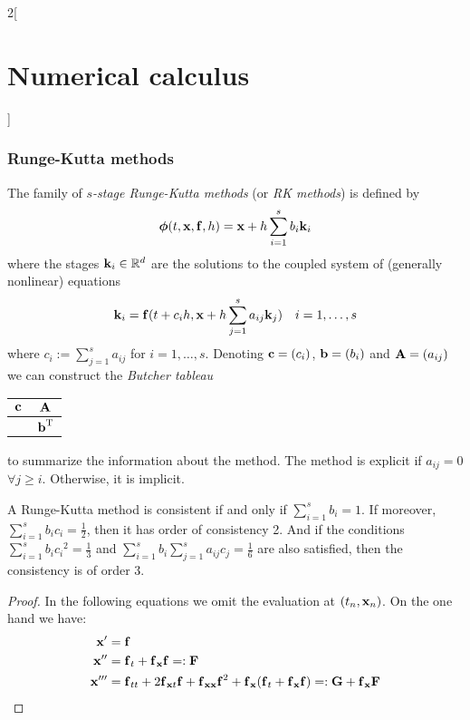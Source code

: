 \documentclass[../../../main_math.tex]{subfiles}
\begin{document}
\begin{multicols}{2}[\section{Numerical calculus}]
  \subsubsection{Runge-Kutta methods}
  \begin{definition}
    The family of \emph{$s$-stage Runge-Kutta methods} (or \emph{RK methods}) is defined by $$\boldsymbol{\mathrm{\phi}}(t,\boldsymbol{\mathrm{x}},\boldsymbol{\mathrm{f}},h)=\boldsymbol{\mathrm{x}}+h\sum_{i=1}^sb_i\boldsymbol{\mathrm{k}}_i$$
    where the stages $\boldsymbol{\mathrm{k}}_i\in\mathbb{R}^d$ are the solutions to the coupled system of (generally nonlinear) equations
    $$\boldsymbol{\mathrm{k}}_i=\boldsymbol{\mathrm{f}}(t+c_ih,\boldsymbol{\mathrm{x}}+h\sum_{j=1}^{s}a_{ij}\boldsymbol{\mathrm{k}}_j)\quad i=1,\ldots,s$$
    where $c_i:=\sum_{j=1}^{s}a_{ij}$ for $i=1,\ldots,s$. Denoting $\boldsymbol{\mathrm{c}}=(c_i)$, $\boldsymbol{\mathrm{b}}=(b_i)$ and $\boldsymbol{\mathrm{A}}=(a_{ij})$ we can construct the \emph{Butcher tableau}
    \begin{center}
      \renewcommand{\arraystretch}{1.25}
      \begin{tabular}{c|c}
        $\boldsymbol{\mathrm{c}}$ & $\boldsymbol{\mathrm{A}}$             \\
        \hline
                 & ${\boldsymbol{\mathrm{b}}}^{\mathrm{T}}$
      \end{tabular}
    \end{center}
    to summarize the information about the method. The method is explicit if $a_{ij}=0$ $\forall j\geq i$. Otherwise, it is implicit.
  \end{definition}
  \begin{lemma}\label{NC:consistencyRK}
    A Runge-Kutta method is consistent if and only if $\sum_{i=1}^sb_i=1$. If moreover, $\sum_{i=1}^sb_ic_i=\frac{1}{2}$, then it has order of consistency 2. And if the conditions $\sum_{i=1}^sb_i{c_i}^2=\frac{1}{3}$ and $\sum_{i=1}^sb_i\sum_{j=1}^sa_{ij}c_j=\frac{1}{6}$ are also satisfied, then the consistency is of order 3.
  \end{lemma}
  \begin{proof}
    In the following equations we omit the evaluation at $(t_n,\boldsymbol{\mathrm{x}}_n)$.
    On the one hand we have:
    \begin{align*}
      \vf{x}'   & =\vf{f}                                                                                                                                         \\
      \vf{x}''  & =\vf{f}_t+\vf{f}_{\vf{x}}\vf{f}=:\vf{F}                                                                                                         \\
      \vf{x}''' & =\vf{f}_{tt}+2\vf{f}_{\vf{x}t}\vf{f}+{\vf{f}_{\vf{xx}}}\vf{f}^2+\vf{f}_{\vf{x}}(\vf{f}_t+{\vf{f}_{\vf{x}}}\vf{f})=:\vf{G}+\vf{f}_{\vf{x}}\vf{F}

\end{align*}
\end{proof}
\end{multicols}
\end{document}
